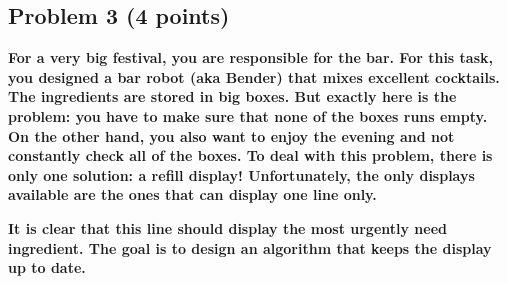 \subsection{Problem 3 (4 points)}

\textbf{For a very big festival, you are responsible for the bar. For this task, you designed a bar robot (aka Bender) that mixes excellent cocktails. The ingredients are stored in big boxes. But exactly here is the problem: you have to make sure that none of the boxes runs empty. On the other hand, you also want to enjoy the evening and not constantly check all of the boxes. To deal with this problem, there is only one solution: a refill display! Unfortunately, the only displays available are the ones that can display one line only.}

\textbf{It is clear that this line should display the most urgently need ingredient. The goal is to design an algorithm that keeps the display up to date.}

